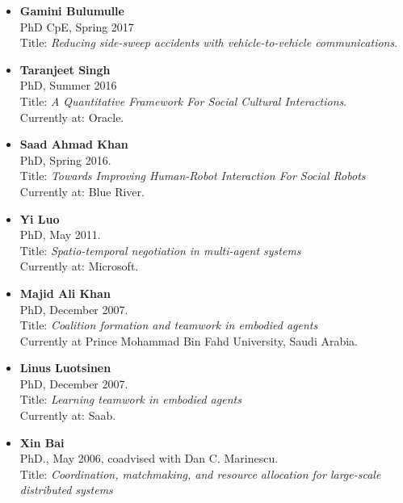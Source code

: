 \begin{itemize}
\item\textbf{Gamini Bulumulle} \\
    PhD CpE, Spring 2017 \\
    Title: \emph{Reducing side-sweep accidents with vehicle-to-vehicle communications}.

\item\textbf{Taranjeet Singh} \\
    PhD, Summer 2016 \\
    Title: \emph{A Quantitative Framework For Social Cultural Interactions}. \\
    Currently at: Oracle.  

\item\textbf{Saad Ahmad Khan} \\
    PhD, Spring 2016. \\ %
    Title: \emph{Towards Improving Human-Robot Interaction For Social Robots} \\
    Currently at: Blue River.

\item\textbf{Yi Luo} \\
    PhD, May 2011. \\
    Title: \emph{Spatio-temporal negotiation in multi-agent systems} \\
    Currently at: Microsoft.
    
\item\textbf{Majid Ali Khan} \\
    PhD, December 2007. \\
    Title: {\em Coalition formation and teamwork in embodied agents} \\
    Currently at Prince Mohammad Bin Fahd University, Saudi Arabia.

\item\textbf{Linus Luotsinen} \\
    PhD, December 2007. \\
    Title: {\em Learning teamwork in embodied agents} \\
    Currently at: Saab.

\item\textbf{Xin Bai} \\
    PhD., May 2006, coadvised with Dan C. Marinescu.\\
    Title: {\em Coordination, matchmaking, and resource allocation for
    large-scale distributed systems}

\end{itemize}    
